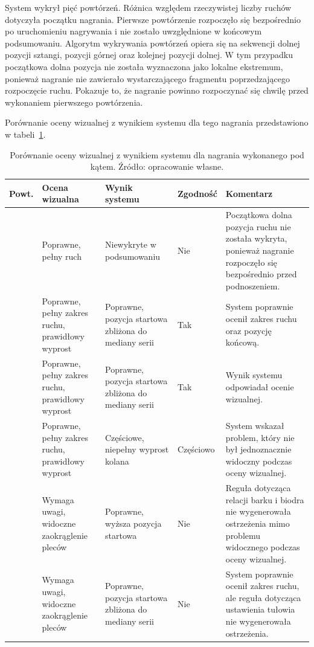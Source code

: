 System wykrył pięć powtórzeń. Różnica względem rzeczywistej liczby ruchów dotyczyła początku nagrania. Pierwsze powtórzenie rozpoczęło się bezpośrednio po uruchomieniu nagrywania i nie zostało uwzględnione w końcowym podsumowaniu. Algorytm wykrywania powtórzeń opiera się na sekwencji dolnej pozycji sztangi, pozycji górnej oraz kolejnej pozycji dolnej. W tym przypadku początkowa dolna pozycja nie została wyznaczona jako lokalne ekstremum, ponieważ nagranie nie zawierało wystarczającego fragmentu poprzedzającego rozpoczęcie ruchu. Pokazuje to, że nagranie powinno rozpoczynać się chwilę przed wykonaniem pierwszego powtórzenia.

Porównanie oceny wizualnej z wynikiem systemu dla tego nagrania przedstawiono w tabeli~\ref{tab:porownanie-nagranie-pod-katem}.

\begin{table}[H]
\centering
\caption{Porównanie oceny wizualnej z wynikiem systemu dla nagrania wykonanego pod kątem. Źródło: opracowanie własne.}
\label{tab:porownanie-nagranie-pod-katem}
\footnotesize
\renewcommand{\arraystretch}{1.08}
\setlength{\tabcolsep}{2.5pt}
\begin{tabular}{|
>{\centering\arraybackslash}p{1.0cm}|
>{\raggedright\arraybackslash}p{3.7cm}|
>{\raggedright\arraybackslash}p{3.8cm}|
>{\centering\arraybackslash}p{1.6cm}|
>{\raggedright\arraybackslash}p{4.0cm}|}
\hline
\textbf{Powt.} & \textbf{Ocena wizualna} & \textbf{Wynik systemu} & \textbf{Zgodność} & \textbf{Komentarz} \\ \hline
1 & Poprawne, pełny ruch & Niewykryte w podsumowaniu & Nie & Początkowa dolna pozycja ruchu nie została wykryta, ponieważ nagranie rozpoczęło się bezpośrednio przed podnoszeniem. \\ \hline
2 & Poprawne, pełny zakres ruchu, prawidłowy wyprost & Poprawne, pozycja startowa zbliżona do mediany serii & Tak & System poprawnie ocenił zakres ruchu oraz pozycję końcową. \\ \hline
3 & Poprawne, pełny zakres ruchu, prawidłowy wyprost & Poprawne, pozycja startowa zbliżona do mediany serii & Tak & Wynik systemu odpowiadał ocenie wizualnej. \\ \hline
4 & Poprawne, pełny zakres ruchu, prawidłowy wyprost & Częściowe, niepełny wyprost kolana & Częściowo & System wskazał problem, który nie był jednoznacznie widoczny podczas oceny wizualnej. \\ \hline
5 & Wymaga uwagi, widoczne zaokrąglenie pleców & Poprawne, wyższa pozycja startowa & Nie & Reguła dotycząca relacji barku i biodra nie wygenerowała ostrzeżenia mimo problemu widocznego podczas oceny wizualnej. \\ \hline
6 & Wymaga uwagi, widoczne zaokrąglenie pleców & Poprawne, pozycja startowa zbliżona do mediany serii & Nie & System poprawnie ocenił zakres ruchu, ale reguła dotycząca ustawienia tułowia nie wygenerowała ostrzeżenia. \\ \hline
\end{tabular}
\end{table}

